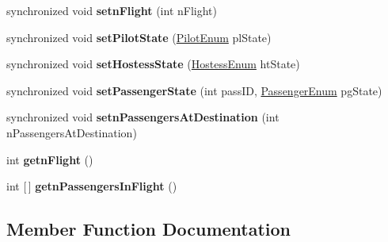 \begin{DoxyCompactItemize}
\mbox{\label{classshared_regions_1_1_repository_a861524965e041f635a18ed7dab515644}} 
synchronized void {\bfseries setn\+Flight} (int n\+Flight)
\item 
\mbox{\label{classshared_regions_1_1_repository_afe742ad0e099e2dc3f936ed2ae6fe32d}} 
synchronized void {\bfseries set\+Pilot\+State} (\hyperlink{enumentities_1_1_pilot_enum}{Pilot\+Enum} pl\+State)
\item 
\mbox{\label{classshared_regions_1_1_repository_aac95a1347f2c12608593f45eb3e7cbdd}} 
synchronized void {\bfseries set\+Hostess\+State} (\hyperlink{enumentities_1_1_hostess_enum}{Hostess\+Enum} ht\+State)
\item 
\mbox{\label{classshared_regions_1_1_repository_a112f179c04b8e8c76afd4150f105315d}} 
synchronized void {\bfseries set\+Passenger\+State} (int pass\+ID, \hyperlink{enumentities_1_1_passenger_enum}{Passenger\+Enum} pg\+State)
\item 
\mbox{\label{classshared_regions_1_1_repository_ae5c7a992aa4d5d14f4d1887718ad100c}} 
synchronized void {\bfseries setn\+Passengers\+At\+Destination} (int n\+Passengers\+At\+Destination)
\item 
\mbox{\label{classshared_regions_1_1_repository_a7b00c4a1f9c60c34b87c9106eb7908c4}} 
int {\bfseries getn\+Flight} ()
\item 
\mbox{\label{classshared_regions_1_1_repository_a72428c11fc633123613011915c19207a}} 
int \mbox{[}$\,$\mbox{]} {\bfseries getn\+Passengers\+In\+Flight} ()
\end{DoxyCompactItemize}


\subsection{Member Function Documentation}
\mbox{\label{classshared_regions_1_1_repository_a6b066a95aa6b17fbf890698c82048cf5}} 

